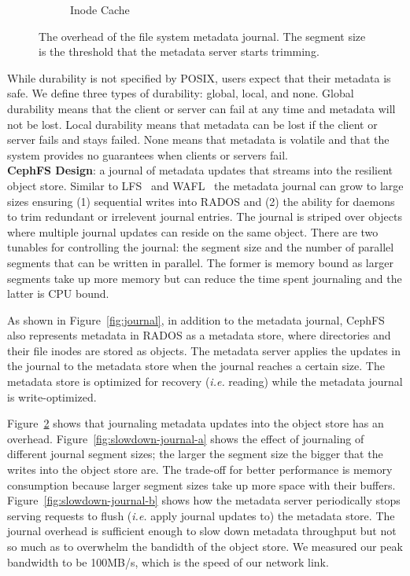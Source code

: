 \begin{figure}[t]
\begin{subfigure}[b]{.3\linewidth}
      \caption{Inode Cache}
      \label{fig:slowdown-journal-c}
  \end{subfigure}
  \caption{The overhead of the file system metadata journal. The segment size
  is the threshold that the metadata server starts
  trimming.\label{fig:slowdown-journal}}
\end{figure}

While durability is not specified by POSIX, users expect that their metadata is
safe. We define three types of durability: global, local, and none.  Global
durability means that the client or server can fail at any time and metadata
will not be lost. Local durability means that metadata can be lost if the
client or server fails and stays failed. None means that metadata is volatile
and that the system provides no guarantees when clients or servers fail.\\

\noindent\textbf{CephFS Design}: a journal of metadata updates that streams into
the resilient object store. Similar to LFS~\cite{rosenblum:acm1992-LFS} and
WAFL~\cite{hitz:wtec1994-WAFL} the metadata journal can grow to large sizes
ensuring (1) sequential writes into RADOS and (2) the ability for daemons to
trim redundant or irrelevent journal entries.  The journal is striped over
objects where multiple journal updates can reside on the same object. There are
two tunables for controlling the journal: the segment size and the number of
parallel segments that can be written in parallel. The former is memory bound
as larger segments take up more memory but can reduce the time spent journaling
and the latter is CPU bound. 

As shown in Figure~\ref{fig:journal}, in addition to the metadata journal,
CephFS also represents metadata in RADOS as a metadata store, where directories
and their file inodes are stored as objects.  The metadata server applies the
updates in the journal to the metadata store when the journal reaches a certain
size. The metadata store is optimized for recovery ({\it i.e.} reading) while
the metadata journal is write-optimized.

Figure~\ref{fig:slowdown-journal} shows that journaling metadata updates into
the object store has an overhead. Figure~\ref{fig:slowdown-journal-a} shows the
effect of journaling of different journal segment sizes; the larger the segment
size the bigger that the writes into the object store are. The trade-off for
better performance is memory consumption because larger segment sizes take up
more space with their buffers. Figure~\ref{fig:slowdown-journal-b} shows how
the metadata server periodically stops serving requests to flush ({\it i.e.}
apply journal updates to) the metadata store.  The journal overhead is
sufficient enough to slow down metadata throughput but not so much as to
overwhelm the bandidth of the object store. We measured our peak bandwidth to
be 100MB/s, which is the speed of our network link.\\

